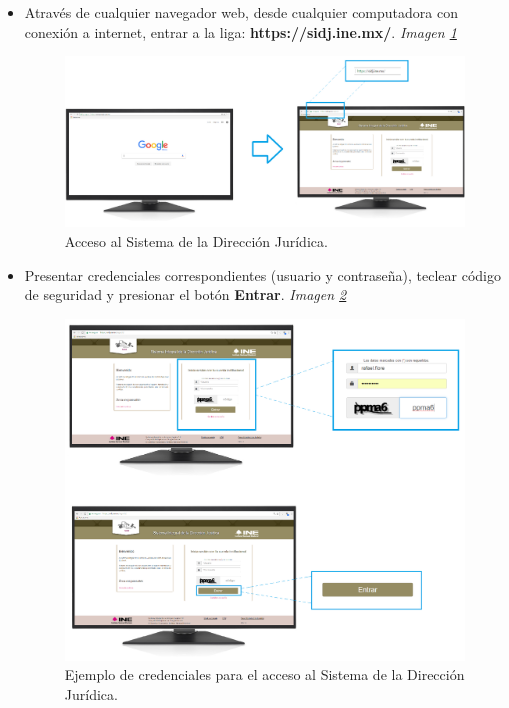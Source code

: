 \documentclass[../reportesINE.tex]{subfiles}
\begin{document}
\begin{itemize}
\item Através de cualquier navegador web, desde cualquier computadora con conexión a internet, entrar a la liga: \textbf{https://sidj.ine.mx/}. \textit{Imagen \ref{fig:ej1}}

\begin{figure}[h]
  \centering
  \includegraphics[width=\linewidth]{ejemplo/ej1.png}
  \caption{Acceso al Sistema de la Dirección Jurídica.}
  \label{fig:ej1}
\end{figure}

\item Presentar credenciales correspondientes (usuario y contraseña), teclear código de seguridad y presionar el botón \textbf{Entrar}. \textit{Imagen \ref{fig:ej2}}

\begin{figure}[h]
  \centering
  \includegraphics[width=\linewidth]{ejemplo/ej2.png}
  \caption{Ejemplo de  credenciales para el acceso al Sistema de la Dirección Jurídica.}
  \label{fig:ej2}
\end{figure}


\end{itemize}
\end{document}
